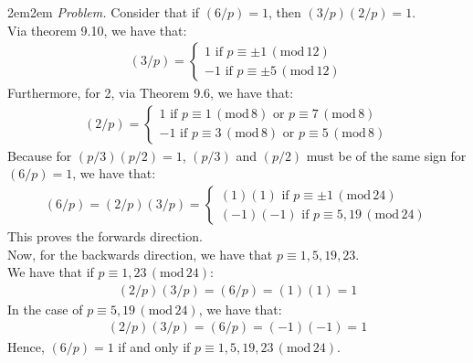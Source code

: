 \documentclass[10pt,oneside]{book}
\newcommand{\gspc}{\vspace{0.13cm}} %
\newcommand{\gline}{\gspc\\} %
\newcommand{\gmod}[1]{\,(\text{mod}\,#1)}
\let\endoldproof\endproof
\newenvironment{problem}[1]
  {\vspace{-0.1cm}\begin{coloredadjust}\begin{adjustwidth}{2em}{2em}
   \textit{Problem. }#1}
  {\endoldproof
\end{adjustwidth}\end{coloredadjust}\gspc}
\begin{document}
\begin{enumerate}
\begin{enumerate}
    \begin{problem}
      Consider that if $(6/p)=1$, then $(3/p)(2/p)=1$. \gline 
      Via theorem 9.10, we have that:
      \begin{align*}
        (3/p)=\begin{cases}
          1 \text{ if } p\equiv \pm 1 \gmod {12}\\
          -1 \text{ if }p \equiv \pm 5 \gmod{12}
        \end{cases}
      \end{align*}
      Furthermore, for 2, via Theorem 9.6, we have that:
      \begin{align*}
        (2/p)=\begin{cases}
          1\text{ if }p\equiv 1\gmod{8}\text{ or }p\equiv 7\gmod 8\\
          -1 \text{ if }p\equiv 3 \gmod 8\text{ or } p \equiv 5 \gmod 8
        \end{cases}
      \end{align*}
      Because for $(p/3)(p/2)=1$, $(p/3)$ and $(p/2)$ must be of the same sign for $(6/p)=1$, we have that:
      \begin{align*}
        (6/p)=(2/p)(3/p)=\begin{cases}
          (1)(1)\text{ if }p\equiv \pm 1 \gmod{24}\\
          (-1)(-1)\text{ if }p\equiv 5, 19\gmod{24}
        \end{cases}
      \end{align*}
      This proves the forwards direction.\gline
      Now, for the backwards direction, we have that $p \equiv 1, 5, 19, 23$. \gline
      We have that if $p \equiv 1, 23\gmod{24}$:
      \begin{align*}
        (2/p)(3/p)=(6/p)=(1)(1)=1
      \end{align*}
      In the case of $p\equiv 5, 19\gmod{24}$, we have that:
      \begin{align*}
        (2/p)(3/p)=(6/p)=(-1)(-1)=1
      \end{align*}
      Hence, $(6/p)=1$ if and only if $p\equiv 1, 5, 19, 23\gmod{24}$. 
    \end{problem}
  \end{enumerate}
\end{enumerate}
\end{document}
